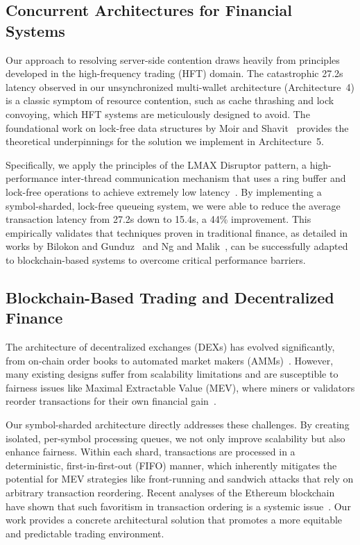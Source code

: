 \subsection{Concurrent Architectures for Financial Systems}

Our approach to resolving server-side contention draws heavily from principles developed in the high-frequency trading (HFT) domain. The catastrophic 27.2s latency observed in our unsynchronized multi-wallet architecture (Architecture~4) is a classic symptom of resource contention, such as cache thrashing and lock convoying, which HFT systems are meticulously designed to avoid. The foundational work on lock-free data structures by Moir and Shavit~\cite{moir2018concurrent} provides the theoretical underpinnings for the solution we implement in Architecture~5.

Specifically, we apply the principles of the LMAX Disruptor pattern, a high-performance inter-thread communication mechanism that uses a ring buffer and lock-free operations to achieve extremely low latency~\cite{thompson2011disruptor}. By implementing a symbol-sharded, lock-free queueing system, we were able to reduce the average transaction latency from 27.2s down to 15.4s, a 44\% improvement. This empirically validates that techniques proven in traditional finance, as detailed in works by Bilokon and Gunduz~\cite{bilokon2023cpp} and Ng and Malik~\cite{ng2018lockfree}, can be successfully adapted to blockchain-based systems to overcome critical performance barriers.

\subsection{Blockchain-Based Trading and Decentralized Finance}

The architecture of decentralized exchanges (DEXs) has evolved significantly, from on-chain order books to automated market makers (AMMs)~\cite{xu2023sok}. However, many existing designs suffer from scalability limitations and are susceptible to fairness issues like Maximal Extractable Value (MEV), where miners or validators reorder transactions for their own financial gain~\cite{alipanahloo2024mev}.

Our symbol-sharded architecture directly addresses these challenges. By creating isolated, per-symbol processing queues, we not only improve scalability but also enhance fairness. Within each shard, transactions are processed in a deterministic, first-in-first-out (FIFO) manner, which inherently mitigates the potential for MEV strategies like front-running and sandwich attacks that rely on arbitrary transaction reordering. Recent analyses of the Ethereum blockchain have shown that such favoritism in transaction ordering is a systemic issue~\cite{mancino2025mev}. Our work provides a concrete architectural solution that promotes a more equitable and predictable trading environment.

